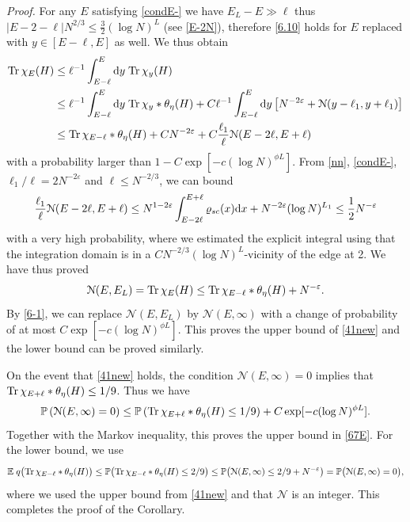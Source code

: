 \documentclass[draft]{article}
\newcommand{\e}{\varepsilon}
\newcommand{\rd}{{\rm d}}
\newcommand{\tr}{\mbox{Tr\,}}
\newcommand{\be}{\begin{equation}}
\newcommand{\ee}{\end{equation}}
\newcommand{\cN}{{\mathcal N}}
\newcommand{\E}{{\mathbb E }}
\renewcommand{\P}{{\mathbb P}}
\newcommand{\qed}{\hfill\fbox{}\par\vspace{0.3mm}}
\numberwithin{equation}{section}
\numberwithin{theorem}{section}
\numberwithin{definition}{section}
\numberwithin{remark}{section}
\begin{document}
{\it Proof.} For any $E$ satisfying  \eqref{condE-} we have
$E_L-E \gg \ell$ thus $|E-2-\ell|N^{2/3}\le\frac{3}{2}(\log N)^L$
(see \eqref{E-2N}), therefore \eqref{6.10} holds for $E$ 
replaced with $y\in [E-\ell, E]$ as well. We thus obtain
\begin{align*}
 \tr \chi_{E }  (H) & \le \ell^{-1}  \int_{E- \ell }^E  \rd y \;\tr \chi_y (H) \\
& \le  \ell^{-1}  \int_{E- \ell}^E  \rd y \;  
 \tr \chi_y  \ast \theta_\eta (H)  
  +      C\ell^{-1}   \int_{E- \ell }^E  \rd y \left [ N^{-2\e}  
 +   \cN (y-\ell_1, y+\ell_1)  \right] \\
 & \le     \tr \chi_{E- \ell  }  \ast \theta_\eta (H)  +  CN^{- 2 \e}+ 
   C  \frac{\ell_1}{\ell}  \cN (E- 2\ell , E + \ell ) 
\end{align*} 
with a probability larger than $1 - C \exp [ - c(\log N)^{\phi L} ]$. 
From \eqref{nn}, \eqref{condE-}, $\ell_1/\ell=2N^{-2\e}$ and $ \ell \le N^{-2/3}$, we can bound 
$$
  \frac{\ell_1}{\ell}  \cN (E- 2\ell , E+ \ell ) 
 \le N^{1-2\e} \int_{E-2\ell}^{E+\ell}\varrho_{sc}(x)\rd x + N^{-2\e}(\log N)^{L_1}
 \le \frac{1}{2}N^{-\e}
$$
with a very high probability, where we estimated the explicit integral
using that the integration domain is in a $CN^{-2/3}(\log N)^L$-vicinity of
the edge at 2.
We have thus proved 
\[
\cN(E, E_L) =   \tr \chi_{E }  (H) \le  \tr  \chi_{E- \ell  }  \ast \theta_\eta (H)  +  N^{-\e}.
\]
By \eqref{6-1}, we can replace $\cN(E, E_L)$ by $\cN(E,  \infty)$
 with  a change of probability of at most 
$C\exp [ -c (\log N)^{\phi L}]$. This proves the upper bound of \eqref{41new}
 and the lower bound can be proved similarly.


On the event that \eqref{41new} holds, the condition  
$\cN(E, \infty) = 0$ implies that $\tr \chi_{E+\ell}  \ast \theta_\eta (H) \leq 1/9$. Thus we have
\be\label{Pleft}
\P\left(\cN(E, \infty)=0\right)\leq \P\left(\tr  \chi_{E+\ell} 
 \ast \theta_\eta (H) \leq 1/9\right)+C\exp[-c(\log N)^{\phi L}].
\ee
Together with the Markov inequality, 
this proves the upper bound in \eqref{67E}. For the lower bound, we use
$$
\E\;  q \big(\tr \chi_{E-\ell}  \ast \theta_\eta  (H) \big)
\le \P \big( \tr \chi_{E-\ell}  \ast \theta_\eta  (H)\le 2/9\big)
\le \P \big( \cN(E,\infty)\le 2/9+N^{-\e}\big)
 =\P \big( \cN(E,\infty)=0\big),
$$
where we used the upper bound from \eqref{41new} and that $\cN$ is an integer.
This  completes the proof of the Corollary. 
\qed

\bigskip 
\end{document}
